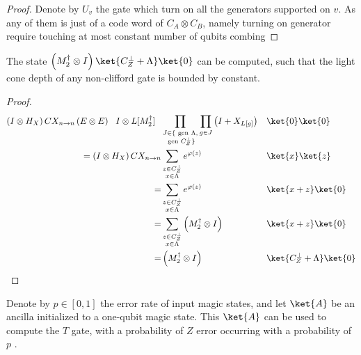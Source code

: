 \begin{proof}
  Denote by $U_{v}$ the gate which turn on all the generators supported on $v$.
  As any of them is just of a code word of $C_{A}\otimes C_{B}$, namely turning
  on generator require touching at most constant number of qubits combing
\end{proof}

\begin{claim}
  \label{claim:lowlightcone}
  The state $\left(M_{2}^{\dagger}\otimes I\right)\ket{ C_{Z}^{\perp} +
  \Lambda   }\ket{0}$ can be computed, such that the light cone depth of any
  non-clifford gate is bounded by constant.
\end{claim}
\begin{proof}
  \begin{align*}
    \left( I \otimes H_{X} \right) CX_{n\rightarrow n} \left(E \otimes E
    \right) \ \ I \otimes L[M_{2}^{\dagger}] \ \ & \prod_{\substack{ J\in \{
    \text{ gen }\Lambda,\\ \text{ gen } C_{Z}^{\perp} \}}} \prod_{g \in J}
    \left(
    I +  X_{L[g]} \right) && \ket{0} \ket{0} \\
    = \left( I \otimes H_{X}   \right) CX_{n\rightarrow n} & \sum_{\substack{ z
    \in C_{Z}^\perp \\  x\in \Lambda}}  e^{\varphi(z)} && \ket{x}\ket{z} \\
    = & \sum_{\substack{ z \in C_{Z}^\perp \\  x\in \Lambda}}   e^{\varphi(z)}
    && \ket{x+z}\ket{0} \\
    = & \sum_{\substack{ z \in C_{Z}^\perp \\  x\in \Lambda}}
    \left(M_{2}^{\dagger}\otimes I\right) && \ket{x+z}\ket{0} \\
    = & \left(M_{2}^{\dagger}\otimes I\right) && \ket{ C_{Z}^{\perp} +
    \Lambda   }\ket{0}
  \end{align*}
\end{proof}
Denote by $p \in [0,1]$ the error rate of input magic states, and let $\ket{A}$
be an ancilla initialized to a one-qubit magic state. This $\ket{A}$ can be
used to compute the $T$ gate, with a probability of $Z$ error occurring with a
probability of $p$ \cite{bravyi2012magic}.
